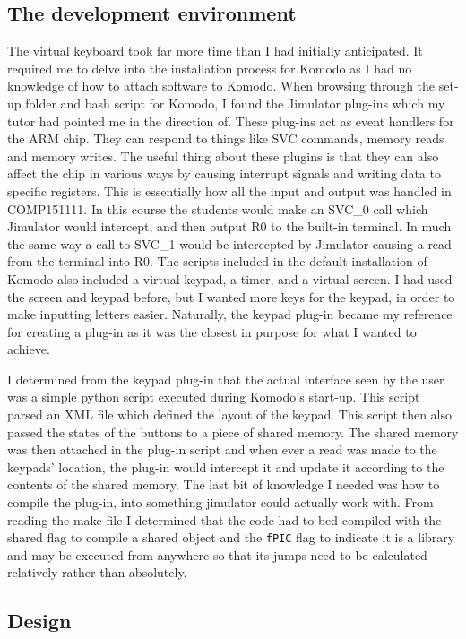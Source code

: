 \subsection{The development environment}
The virtual keyboard took far more time than I had initially anticipated. It required me to delve into the installation process for Komodo as I had no knowledge of how to attach software to Komodo. When browsing through the set-up folder and bash script for Komodo, I found the Jimulator plug-ins which my tutor had pointed me in the direction of. These plug-ins act as event handlers for the ARM chip. They can respond to things like SVC commands, memory reads and memory writes. The useful thing about these plugins is that they can also affect the chip in various ways by causing interrupt signals and writing data to specific registers. This is essentially how all the input and output was handled in COMP151111. In this course the students would make an SVC\_0 call which Jimulator would intercept, and then output R0 to the built-in terminal. In much the same way a call to SVC\_1 would be intercepted by Jimulator causing a read from the terminal into R0. The scripts included in the default installation of Komodo also included a virtual keypad, a timer, and a virtual screen. I had used the screen and keypad before, but I wanted more keys for the keypad, in order to make inputting letters easier. Naturally, the keypad plug-in became my reference for creating a plug-in as it was the closest in purpose for what I wanted to achieve. 

I determined from the keypad plug-in that the actual interface seen by the user was a simple python script executed during Komodo's start-up. This script parsed an XML file which defined the layout of the keypad. This script then also passed the states of the buttons to a piece of shared memory. The shared memory was then attached in the plug-in script and when ever a read was made to the keypads' location, the plug-in would intercept it and update it according to the contents of the shared memory. The last bit of knowledge I needed was how to compile the plug-in, into something jimulator could actually work with. From reading the make file I determined that the code had to bed compiled with the --shared flag to compile a shared object and the \verb|fPIC| flag to indicate it is a library and may be executed from anywhere so that its jumps need to be calculated relatively rather than absolutely.
\subsection{Design}
